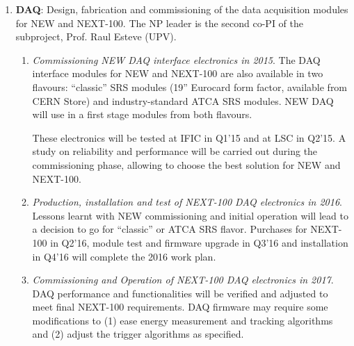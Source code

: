\begin{enumerate}
\item {\bf DAQ}: Design, fabrication and commissioning of the data acquisition modules for NEW and NEXT-100. The NP leader is the second co-PI of the subproject, Prof. Raul Esteve (UPV).

\begin{enumerate}

\item	{\em Commissioning NEW DAQ interface electronics in 2015}. The DAQ interface modules for NEW and NEXT-100 are also available in two flavours: “classic” SRS modules (19” Eurocard form factor, available from CERN Store) and industry-standard ATCA SRS modules. NEW DAQ will use in a first stage modules from both flavours.

These electronics will be tested at IFIC in Q1’15 and at LSC in Q2’15. A study on reliability and performance will be carried out during the commissioning phase, allowing to choose the best solution for NEW and NEXT-100. 

\item	{\em Production, installation and test of NEXT-100 DAQ electronics in 2016}. Lessons learnt with NEW commissioning and initial operation will lead to a decision to go for “classic” or ATCA SRS flavor. Purchases for NEXT-100 in Q2’16, module test and firmware upgrade in Q3’16 and installation in Q4’16 will complete the 2016 work plan.

\item	{\em Commissioning and Operation of NEXT-100 DAQ electronics in 2017}. DAQ performance and functionalities will be verified and adjusted to meet final NEXT-100 requirements. DAQ firmware may require some modifications to (1) ease energy measurement and tracking algorithms and (2) adjust the trigger algorithms as specified.


\end{enumerate}


\end{enumerate}
